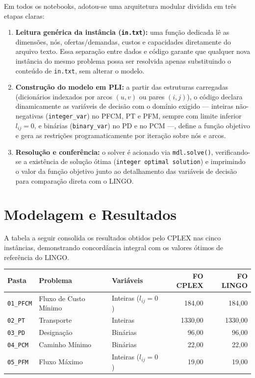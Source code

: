 \documentclass[11pt,a4paper]{article}
\begin{document}
Em todos os notebooks, adotou-se uma arquitetura modular dividida em três etapas claras:
\begin{enumerate}
  \item \textbf{Leitura genérica da instância (\texttt{in.txt}):} uma função dedicada lê as dimensões, nós, ofertas/demandas, custos e capacidades diretamente do arquivo texto. Essa separação entre dados e código garante que qualquer nova instância do mesmo problema possa ser resolvida apenas substituindo o conteúdo de \texttt{in.txt}, sem alterar o modelo.
  \item \textbf{Construção do modelo em PLI:} a partir das estruturas carregadas (dicionários indexados por arcos $(u,v)$ ou pares $(i,j)$), o código declara dinamicamente as variáveis de decisão com o domínio exigido — inteiras não-negativas (\texttt{integer\_var}) no PFCM, PT e PFM, sempre com limite inferior $l_{ij} = 0$, e binárias (\texttt{binary\_var}) no PD e no PCM —, define a função objetivo e gera as restrições programaticamente por iteração sobre nós e arcos.
  \item \textbf{Resolução e conferência:} o solver é acionado via \texttt{mdl.solve()}, verificando-se a existência de solução ótima (\texttt{integer optimal solution}) e imprimindo o valor da função objetivo junto ao detalhamento das variáveis de decisão para comparação direta com o LINGO.
\end{enumerate}

\section{Modelagem e Resultados}
A tabela a seguir consolida os resultados obtidos pelo CPLEX nas cinco instâncias, demonstrando concordância integral com os valores ótimos de referência do LINGO.

\begin{table}[!htbp]
  \centering
  \begin{tabularx}{\linewidth}{l X l r r}
    \toprule
    \textbf{Pasta} & \textbf{Problema} & \textbf{Variáveis} & \textbf{FO CPLEX} & \textbf{FO LINGO} \\
    \midrule
    \texttt{01\_PFCM} & Fluxo de Custo Mínimo & Inteiras ($l_{ij}=0$) & 184,00  & 184,00  \\
    \texttt{02\_PT}   & Transporte            & Inteiras              & 1330,00 & 1330,00 \\
    \texttt{03\_PD}   & Designação            & Binárias              & 96,00   & 96,00   \\
    \texttt{04\_PCM}  & Caminho Mínimo        & Binárias              & 22,00   & 22,00   \\
    \texttt{05\_PFM}  & Fluxo Máximo          & Inteiras ($l_{ij}=0$) & 19,00   & 19,00   \\
    \bottomrule
  \end{tabularx}
\end{table}
\end{document}
